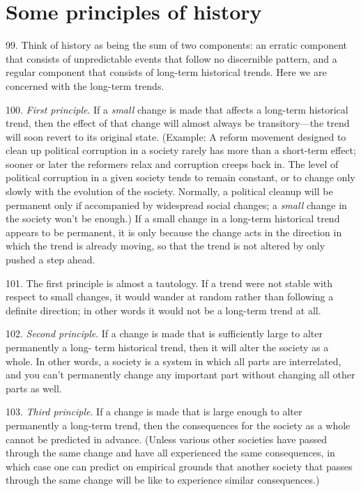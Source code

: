 \documentclass{article}
\begin{document}
\section{Some principles of history}

\hspace{0.5cm} 99.  Think of history as being the sum of two components: an erratic component that consists of 
unpredictable events that follow no discernible pattern, and a regular component that consists of 
long-term historical trends.  Here we are concerned with the long-term trends. \vspace{\baselineskip}

100.  \textit{First principle}.  If a \textit{small} change is made that affects a long-term historical trend, then the 
effect  of  that  change  will  almost  always  be  transitory—the  trend  will  soon  revert  to  its  original  
state.  (Example: A reform movement designed to clean up political corruption in a society rarely 
has more than a short-term effect; sooner or later the reformers relax and corruption creeps back 
in.  The level of political corruption in a given society tends to remain constant, or to change only 
slowly with the evolution of the society.  Normally, a political cleanup will be permanent only if 
accompanied by widespread social changes; a \textit{small} change in the society won’t be enough.) If a
small change in a long-term historical trend appears to be permanent, it is only because the change 
acts in the direction in which the trend is already moving, so that the trend is not altered by only 
pushed a step ahead. \vspace{\baselineskip}

101.  The  first  principle  is  almost  a  tautology.   If  a  trend  were  not  stable  with  respect  to  small  
changes, it would wander at random rather than following a definite direction; in other words it 
would not be a long-term trend at all. \vspace{\baselineskip}

102.  \textit{Second principle}.  If a change is made that is sufficiently large to alter permanently a long-
term historical trend, then it will alter the society as a whole.  In other words, a society is a system 
in which all parts are interrelated, and you can’t permanently change any important part without 
changing all other parts as well. \vspace{\baselineskip}

103.  \textit{Third principle}.  If a change is made that is large enough to alter permanently a long-term 
trend, then the consequences for the society as a whole cannot be predicted in advance.  (Unless 
various other societies have passed through the same change and have all experienced the same 
consequences, in which case one can predict on empirical grounds that another society that passes 
through the same change will be like to experience similar consequences.) \vspace{\baselineskip}
\end{document}
